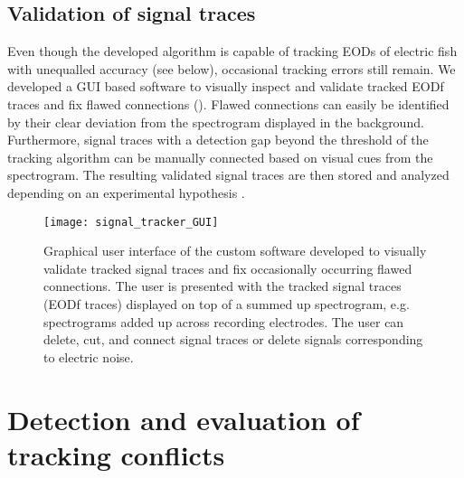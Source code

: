 \subsection{Validation of signal traces}

Even though the developed algorithm is capable of tracking EODs of electric fish with unequalled accuracy (see below), occasional tracking errors still remain. We developed a GUI based software to visually inspect and validate tracked EODf traces and fix flawed connections (). Flawed connections can easily be identified by their clear deviation from the spectrogram displayed in the background. Furthermore, signal traces with a detection gap beyond the threshold of the tracking algorithm can be manually connected based on visual cues from the spectrogram. The resulting validated signal traces are then stored and analyzed depending on an experimental hypothesis \citep{Raab2019, Raab2021}.

\begin{figure}[h!]
  \centerline{\texttt{[image: signal\_tracker\_GUI]}}
  \caption{\label{GUI} Graphical user interface of the custom software developed to visually validate tracked signal traces and fix occasionally occurring flawed connections. The user is presented with the tracked signal traces (EODf traces) displayed on top of a summed up spectrogram, e.g. spectrograms added up across recording electrodes. The user can delete, cut, and connect signal traces or delete signals corresponding to electric noise.}
\end{figure}

\section{Detection and evaluation of tracking conflicts}

